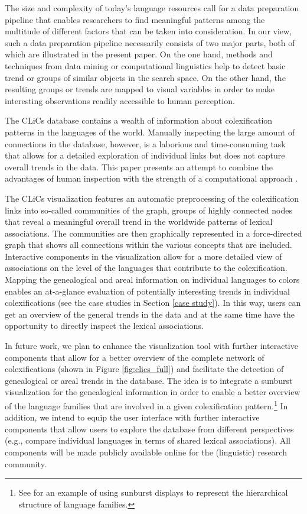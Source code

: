 \documentclass[10pt, a4paper]{article}
\begin{document}
The size and complexity of today's language resources call for a data preparation pipeline that enables researchers to find meaningful patterns among the multitude of different factors that can be taken into consideration. In our view, such a data preparation pipeline necessarily consists of two major parts, both of which are illustrated in the present paper. On the one hand, methods and techniques from data mining or computational linguistics help to detect basic trend or groups of similar objects in the search space. On the other hand, the resulting groups or trends are mapped to visual variables in order to make interesting observations readily accessible to human perception. 

The CLiCs database contains a wealth of information about colexification patterns in the languages of the world. Manually inspecting the large amount of connections in the database, however, is a laborious and time-consuming task that allows for a detailed exploration of individual links but does not capture overall trends in the data. This paper presents an attempt to combine the advantages of human inspection with the strength of a computational approach \cite{Keim2008}. 

The CLiCs visualization features an automatic preprocessing of the colexification links into so-called communities of the graph, groups of highly connected nodes that reveal a meaningful overall trend in the worldwide patterns of lexical associations. The communities are then graphically represented in a force-directed graph that shows all connections within the various concepts that are included. Interactive components in the visualization allow for a more detailed view of associations on the level of the languages that contribute to the colexification. 
Mapping the genealogical and areal information on individual languages to colors enables an at-a-glance evaluation of potentially interesting trends in individual colexifications (see the case studies in Section \ref{case study}). 
In this way, users can get an overview of the general trends in the data and at the same time have the opportunity to directly inspect the lexical associations. 

In future work, we plan to enhance the visualization tool with further interactive components that allow for a better overview of the complete network of colexifications (shown in Figure \ref{fig:clics_full}) and facilitate the detection of genealogical or areal trends in the database. The idea is to integrate a sunburst visualization \cite{Sunburst}  for the genealogical information in order to enable a better overview of the language families that are involved in a given colexification pattern.\footnote{See \cite{MayerLanguageExplorer} for an example of using sunburst displays to represent the hierarchical structure of language families.} In addition, we intend to equip the user interface with further interactive components that allow users to explore the database from different perspectives (e.g., compare individual languages in terms of shared lexical associations). All components will be made publicly available online for the (linguistic) research community. 




\end{document}
